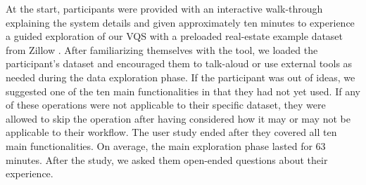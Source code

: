 \par At the start, participants were provided with an interactive walk-through explaining the system details and given approximately ten minutes to experience a guided exploration of our VQS with a preloaded real-estate example dataset from Zillow \cite{zillow}. After familiarizing themselves with the tool, we loaded the participant's dataset and encouraged them to talk-aloud or use external tools as needed during the data exploration phase.%
If the participant was out of ideas, we suggested one of the ten main functionalities in \zv {}that they had not yet used. If any of these operations were not applicable to their specific dataset, they were allowed to skip the operation after having considered how it may or may not be applicable to their workflow. The user study ended after they covered all ten main functionalities. On average, the main exploration phase lasted for 63 minutes. After the study, we asked them open-ended questions about their experience.
